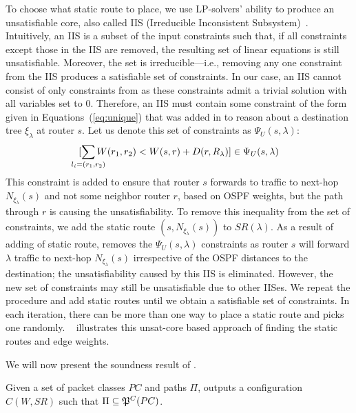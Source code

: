 To choose what static route to place, we use
LP-solvers' ability to produce an
unsatisfiable core, also called IIS (Irreducible Inconsistent Subsystem)~\cite{chinneck2007feasibility}. 
Intuitively, an IIS is a subset of the input constraints such that,
if all constraints except those in the IIS are removed, the resulting set of
linear equations is still unsatisfiable. Moreover, the set is irreducible---i.e., removing 
any one constraint from the IIS produces a satisfiable set of constraints. 
In our case, an IIS cannot consist of only 
constraints from  as these constraints
admit a trivial solution with all variables set to 0. 
Therefore, an IIS must contain some constraint of the form
given in Equations~(\ref{eq:unique})
that was added in to reason about a destination tree $\xi_\lambda$
at router $s$. Let us denote 
this set of constraints as $\Psi_U(s, \lambda)$:
\[
[\sum_{\mathclap{\substack{l_i=(r_1,r_2)}}} 
W(r_1, r_2) < W(s, r) + D(r, R_\lambda) ] \in \Psi_U(s, \lambda)
\]	
This constraint is added to ensure 
that router $s$ forwards to traffic to next-hop
$N_{\xi_\lambda}(s)$ and not some neighbor router 
$r$, based on OSPF weights,
but the path through $r$ is causing the unsatisfiability. 
To remove this inequality from the set of constraints, 
we add the static route $(s,N_{\xi_\lambda}(s))$ to $SR(\lambda)$.
As a result of adding of static route, \name removes 
the $\Psi_U(s, \lambda)$ constraints as router $s$ 
will forward $\lambda$ traffic  to 
next-hop $N_{\xi_\lambda}(s)$ irrespective of
the OSPF distances to the destination; the 
unsatisfiability caused by this IIS is eliminated. 
However, the new set of
constraints may still be unsatisfiable due to other IISes.
We repeat the procedure and add static routes
until we obtain a satisfiable set of
constraints. 
In each iteration, there can be more than one way to place a static route and
\name picks one randomly. ~ illustrates
this unsat-core based approach of finding the static routes and edge weights.

We will now present the soundness result of . 
\begin{theorem} \label{thm:ospfsr}
	Given a set of packet classes $PC$ and paths $\Pi$,  outputs
	a configuration $C(W,SR)$ such that $\Pi\subseteq\mathfrak{P}^C(PC)$.
\end{theorem}
\iffull

\fi

